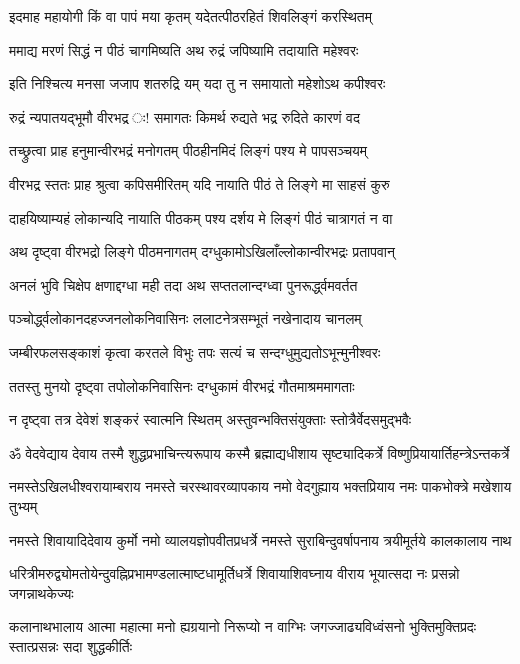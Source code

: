 \twolineshloka
{इदमाह महायोगी किं वा पापं मया कृतम्}
{यदेतत्पीठरहितं शिवलिङ्गं करस्थितम्}%

\twolineshloka
{ममाद्य मरणं सिद्धं न पीठं चागमिष्यति}
{अथ रुद्रं जपिष्यामि तदायाति महेश्वरः}%

\twolineshloka
{इति निश्चित्य मनसा जजाप शतरुद्रि यम्}
{यदा तु न समायातो महेशोऽथ कपीश्वरः}%

\twolineshloka
{रुद्रं न्यपातयद्भूमौ वीरभद्र ः! समागतः}
{किमर्थ रुद्यते भद्र रुदिते कारणं वद}%

\twolineshloka
{तच्छ्रुत्वा प्राह हनुमान्वीरभद्रं मनोगतम्}
{पीठहीनमिदं लिङ्गं पश्य मे पापसञ्चयम्}%

\twolineshloka
{वीरभद्र स्ततः प्राह श्रुत्वा कपिसमीरितम्}
{यदि नायाति पीठं ते लिङ्गे मा साहसं कुरु}%

\twolineshloka
{दाहयिष्याम्यहं लोकान्यदि नायाति पीठकम्}
{पश्य दर्शय मे लिङ्गं पीठं चात्रागतं न वा}%

\twolineshloka
{अथ दृष्ट्वा वीरभद्रो लिङ्गे पीठमनागतम्}
{दग्धुकामोऽखिलाँल्लोकान्वीरभद्रः प्रतापवान्}%

\twolineshloka
{अनलं भुवि चिक्षेप क्षणाद्दग्धा मही तदा}
{अथ सप्ततलान्दग्ध्वा पुनरूर्द्ध्वमवर्तत}%

\twolineshloka
{पञ्चोर्द्ध्वलोकानदहज्जनलोकनिवासिनः}
{ललाटनेत्रसम्भूतं नखेनादाय चानलम्}%

\twolineshloka
{जम्बीरफलसङ्काशं कृत्वा करतले विभुः}
{तपः सत्यं च सन्दग्धुमुद्यतोऽभून्मुनीश्वरः}%

\twolineshloka
{ततस्तु मुनयो दृष्ट्वा तपोलोकनिवासिनः}
{दग्धुकामं वीरभद्रं गौतमाश्रममागताः}%

\twolineshloka
{न दृष्ट्वा तत्र देवेशं शङ्करं स्वात्मनि स्थितम्}
{अस्तुवन्भक्तिसंयुक्ताः स्तोत्रैर्वेदसमुद्भवैः}%

\twolineshloka
{ॐ वेदवेद्याय देवाय तस्मै शुद्धप्रभाचिन्त्यरूपाय कस्मै}
{ब्रह्माद्यधीशाय सृष्ट्यादिकर्त्रे विष्णुप्रियायार्तिहन्त्रेऽन्तकर्त्रे}%

\twolineshloka
{नमस्तेऽखिलधीश्वरायाम्बराय नमस्ते चरस्थावरव्यापकाय}
{नमो वेदगुह्याय भक्तप्रियाय नमः पाकभोक्त्रे मखेशाय तुभ्यम्}%

\twolineshloka
{नमस्ते शिवायादिदेवाय कुर्मो नमो व्यालयज्ञोपवीतप्रधर्त्रे}
{नमस्ते सुराबिन्दुवर्षापनाय त्रयीमूर्तये कालकालाय नाथ}%

\twolineshloka
{धरित्रीमरुद्व्योमतोयेन्दुवह्निप्रभामण्डलात्माष्टधामूर्तिधर्त्रे}
{शिवायाशिवघ्नाय वीराय भूयात्सदा नः प्रसन्नो जगन्नाथकेज्यः}%

\twolineshloka
{कलानाथभालाय आत्मा महात्मा मनो ह्यग्रयानो निरूप्यो न वाग्भिः}
{जगज्जाढ्यविध्वंसनो भुक्तिमुक्तिप्रदः स्तात्प्रसन्नः सदा शुद्धकीर्तिः}%

